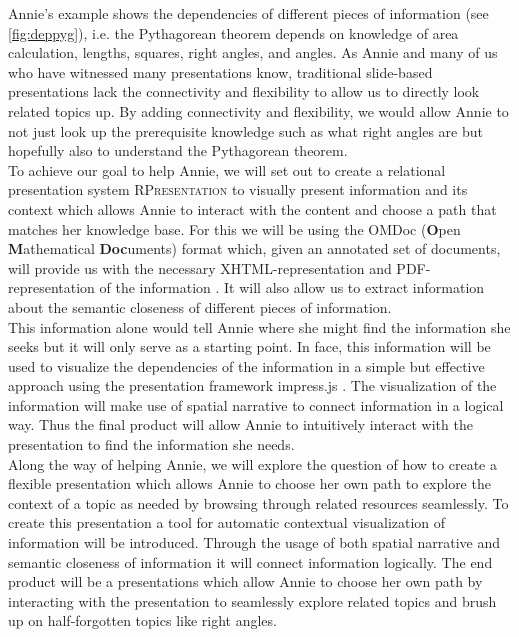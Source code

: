 \documentclass[twoside, 12pt]{article}
\newcommand{\sys}{\textsc{RPresentation}\xspace}
\begin{document}
Annie's example shows the dependencies of different pieces of information (see \autoref{fig:deppyg}), i.e. the Pythagorean theorem depends on knowledge of area calculation, lengths, squares, right angles, and angles. As Annie and many of us who have witnessed many presentations know, traditional slide-based presentations lack the connectivity and flexibility to allow us to directly look related topics up. By adding connectivity and flexibility, we would allow Annie to not just look up the prerequisite knowledge such as what right angles are but hopefully also to understand the Pythagorean theorem.\\

To achieve our goal to help Annie, we will set out to create a relational presentation system \sys to visually present information and its context which allows Annie to interact with the content and choose a path that matches her knowledge base. For this we will be using the OMDoc (\textbf{O}pen \textbf{M}athematical \textbf{Doc}uments) format which, given an annotated set of documents, will provide us with the necessary XHTML-representation and PDF-representation of the information \cite{Kohlhase:OMDoc1.2}. It will also allow us to extract information about the semantic closeness of different pieces of information.\\

This information alone would tell Annie where she might find the information she seeks but it will only serve as a starting point. In face, this information will be used to visualize the dependencies of the information in a simple but effective approach using the presentation framework impress.js \cite{JSImpress:npentrel14}. The visualization of the information will make use of spatial narrative to connect information in a logical way. Thus the final product will allow Annie to intuitively interact with the presentation to find the information she needs.\\

Along the way of helping Annie, we will explore the question of how to create a flexible presentation which allows Annie to choose her own path to explore the context of a topic as needed by browsing through related resources seamlessly. To create this presentation a tool for automatic contextual visualization of information will be introduced. Through the usage of both spatial narrative and semantic closeness of information it will connect information logically. The end product will be a presentations which allow Annie to choose her own path by interacting with the presentation to seamlessly explore related topics and brush up on half-forgotten topics like right angles.\\
\end{document}
